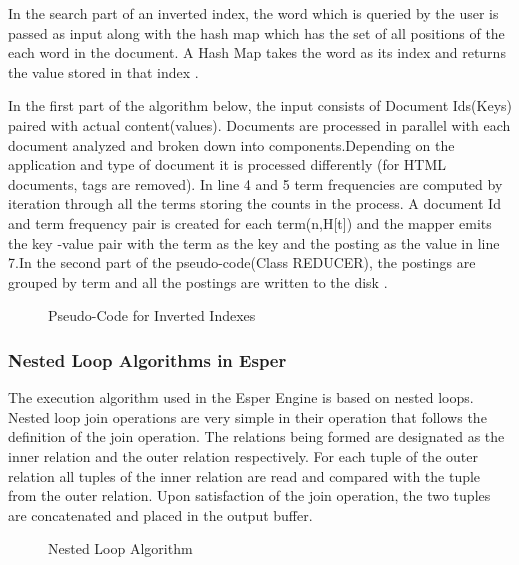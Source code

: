 \noindent In the search part of an inverted index, the word which is queried by the user is passed as input along with the hash map which has the set of all positions of the each word in the document. A Hash Map takes the word as its index and returns the value stored in that index \cite{twentyeight}.

\noindent In the first part of the algorithm below, the input consists of Document Ids(Keys) paired with actual content(values). Documents are processed in parallel with each document analyzed and broken down into components.Depending on the application and type of document it is processed differently (for HTML documents, tags are removed). In line 4 and 5 term frequencies are computed by iteration through all the terms storing the counts in the process. A document Id and term frequency pair is created for each term(n,H[t]) and the mapper emits the key -value pair with the term as the key and the posting as the value in line 7.In the second part of the pseudo-code(Class REDUCER), the postings are grouped by term and all the postings are written to the disk \cite{thirtytwo}.


\begin{center}
\begin{figure}[h]
\caption{Pseudo-Code for Inverted Indexes \cite{thirtytwo}}

\end{figure}
\end{center}

\subsubsection{Nested Loop Algorithms in Esper}

\noindent The execution algorithm used in the Esper Engine is based on nested loops. Nested loop join operations are very simple in their operation that follows the definition of the join operation. The relations being formed are designated as the inner relation and the outer relation respectively. For each tuple of the outer relation all tuples  of the inner relation are read and compared with the tuple from the outer relation. Upon satisfaction of the join operation, the two tuples are concatenated and placed in the output buffer.
\newpage

\begin{center}
\begin{figure}[h]
\caption{Nested Loop Algorithm\cite{twentynine}}

\end{figure}
\end{center}

